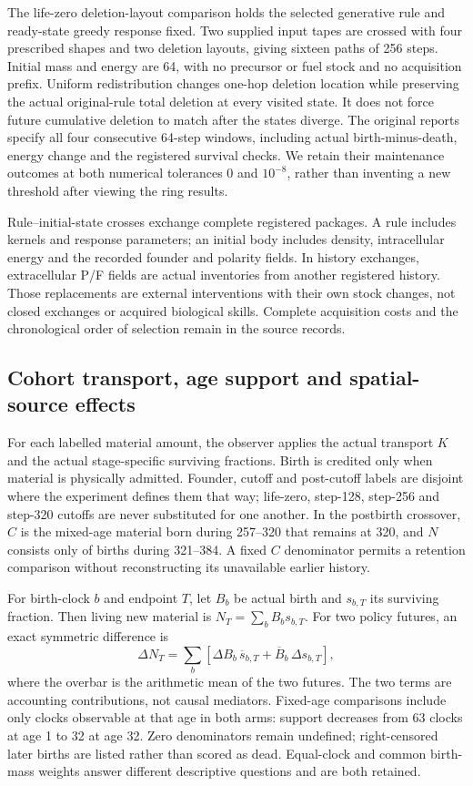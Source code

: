 The life-zero deletion-layout comparison holds the selected generative rule and ready-state greedy response fixed. Two supplied input tapes are crossed with four prescribed shapes and two deletion layouts, giving sixteen paths of 256 steps. Initial mass and energy are 64, with no precursor or fuel stock and no acquisition prefix. Uniform redistribution changes one-hop deletion location while preserving the actual original-rule total deletion at every visited state. It does not force future cumulative deletion to match after the states diverge. The original reports specify all four consecutive 64-step windows, including actual birth-minus-death, energy change and the registered survival checks. We retain their maintenance outcomes at both numerical tolerances 0 and $10^{-8}$, rather than inventing a new threshold after viewing the ring results.

Rule--initial-state crosses exchange complete registered packages. A rule includes kernels and response parameters; an initial body includes density, intracellular energy and the recorded founder and polarity fields. In history exchanges, extracellular P/F fields are actual inventories from another registered history. Those replacements are external interventions with their own stock changes, not closed exchanges or acquired biological skills. Complete acquisition costs and the chronological order of selection remain in the source records.

\subsection*{Cohort transport, age support and spatial-source effects}

For each labelled material amount, the observer applies the actual transport $K$ and the actual stage-specific surviving fractions. Birth is credited only when material is physically admitted. Founder, cutoff and post-cutoff labels are disjoint where the experiment defines them that way; life-zero, step-128, step-256 and step-320 cutoffs are never substituted for one another. In the postbirth crossover, $C$ is the mixed-age material born during 257--320 that remains at 320, and $N$ consists only of births during 321--384. A fixed $C$ denominator permits a retention comparison without reconstructing its unavailable earlier history.

For birth-clock $b$ and endpoint $T$, let $B_b$ be actual birth and $s_{b,T}$ its surviving fraction. Then living new material is $N_T=\sum_bB_bs_{b,T}$. For two policy futures, an exact symmetric difference is
\begin{equation}
\Delta N_T=\sum_b\left[\Delta B_b\,\overline{s}_{b,T}
+\overline{B}_b\,\Delta s_{b,T}\right],
\end{equation}
where the overbar is the arithmetic mean of the two futures. The two terms are accounting contributions, not causal mediators. Fixed-age comparisons include only clocks observable at that age in both arms: support decreases from 63 clocks at age 1 to 32 at age 32. Zero denominators remain undefined; right-censored later births are listed rather than scored as dead. Equal-clock and common birth-mass weights answer different descriptive questions and are both retained.

